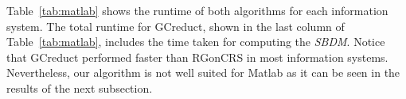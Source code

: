 \documentclass[authoryear,preprint,review,12pt]{elsarticle}
\begin{document}
	Table~\ref{tab:matlab} shows the runtime of both algorithms for each information system. The total runtime for GCreduct, shown in the last column of Table~\ref{tab:matlab}, includes the time taken for computing the \textit{SBDM}. Notice that GCreduct performed faster than RGonCRS in most information systems. Nevertheless, our algorithm is not well suited for Matlab as it can be seen in the results of the next subsection.
\end{document}
